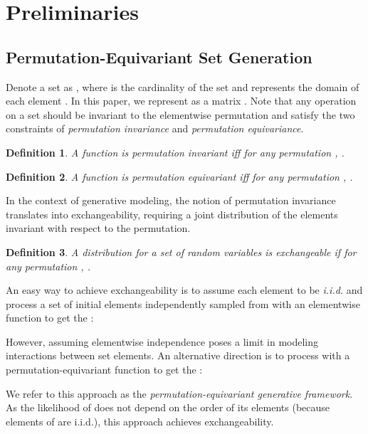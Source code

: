 \documentclass[final]{arxiv/cvpr}
\newtheorem{defn}{Definition}
\begin{document}
 \section{Preliminaries}
\label{sec:preliminary}
\subsection{Permutation-Equivariant Set Generation}

\label{sec:equivariant}
Denote a set as , where  is the cardinality of the set and  represents the domain of each element .
In this paper, we represent  as a matrix .
Note that any operation on a set should be invariant to the elementwise permutation and satisfy the two constraints of \textit{permutation invariance} and \textit{permutation equivariance}.
\begin{defn}
A function  is permutation invariant iff for any permutation , .
\end{defn}
\begin{defn}
A function  is permutation equivariant iff for any permutation , .
\end{defn}
In the context of generative modeling, the notion of permutation invariance translates into exchangeability, requiring a joint distribution of the elements invariant with respect to the permutation.
\begin{defn}
A distribution for a set of random variables  is exchangeable if for any permutation ,
.
\end{defn}

An easy way to achieve exchangeability is to assume each element to be \emph{i.i.d.} and process a set of initial elements  independently sampled from  with an elementwise function  to get the :


However, assuming elementwise independence poses a limit in modeling interactions between set elements.
An alternative direction is to process  with a permutation-equivariant function  to get the :


We refer to this approach as the \textit{permutation-equivariant generative framework}.
As the likelihood of  does not depend on the order of its elements (because elements of  are i.i.d.), this approach achieves exchangeability.
\end{document}
